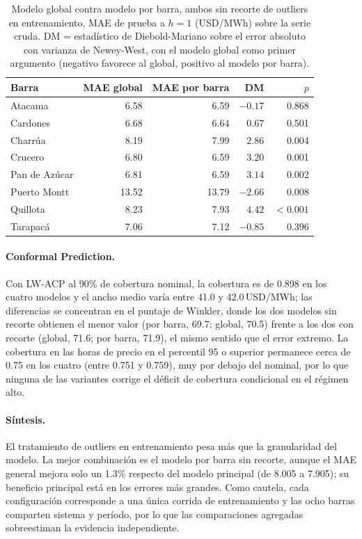 \begin{table}[htbp]
    \centering
    \begin{tabular}{lrrrr}
        \toprule
        Barra & MAE global & MAE por barra & DM & $p$ \\
        \midrule
        Atacama       & 6.58  & 6.59  & $-0.17$ & 0.868    \\
        Cardones      & 6.68  & 6.64  & $0.67$  & 0.501    \\
        Charrúa       & 8.19  & 7.99  & $2.86$  & 0.004    \\
        Crucero       & 6.80  & 6.59  & $3.20$  & 0.001    \\
        Pan de Azúcar & 6.81  & 6.59  & $3.14$  & 0.002    \\
        Puerto Montt  & 13.52 & 13.79 & $-2.66$ & 0.008    \\
        Quillota      & 8.23  & 7.93  & $4.42$  & $<0.001$ \\
        Tarapacá      & 7.06  & 7.12  & $-0.85$ & 0.396    \\
        \bottomrule
    \end{tabular}
    \vspace{0.2cm}
    \caption{Modelo global contra modelo por barra, ambos sin recorte de outliers en entrenamiento, MAE de prueba a $h=1$ (USD/MWh) sobre la serie cruda. DM = estadístico de Diebold-Mariano sobre el error absoluto con varianza de Newey-West, con el modelo global como primer argumento (negativo favorece al global, positivo al modelo por barra).}
    \label{tab:global_vs_barra_sin}
\end{table}

\paragraph{Conformal Prediction.} Con LW-ACP al 90\% de cobertura nominal, la cobertura es de 0.898 en los cuatro modelos y el ancho medio varía entre 41.0 y 42.0\,USD/MWh; las diferencias se concentran en el puntaje de Winkler, donde los dos modelos sin recorte obtienen el menor valor (por barra, 69.7; global, 70.5) frente a los dos con recorte (global, 71.6; por barra, 71.9), el mismo sentido que el error extremo. La cobertura en las horas de precio en el percentil 95 o superior permanece cerca de 0.75 en los cuatro (entre 0.751 y 0.759), muy por debajo del nominal, por lo que ninguna de las variantes corrige el déficit de cobertura condicional en el régimen alto.

\paragraph{Síntesis.} El tratamiento de outliers en entrenamiento pesa más que la granularidad del modelo. La mejor combinación es el modelo por barra sin recorte, aunque el MAE general mejora solo un 1.3\% respecto del modelo principal (de 8.005 a 7.905); su beneficio principal está en los errores más grandes. Como cautela, cada configuración corresponde a una única corrida de entrenamiento y las ocho barras comparten sistema y período, por lo que las comparaciones agregadas sobreestiman la evidencia independiente.
